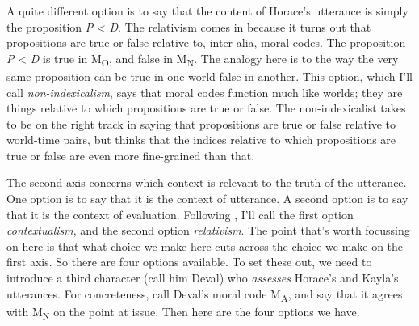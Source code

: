 A quite different option is to say that the content of Horace's utterance is simply the proposition \textit{P }{\textless}\textit{ D}. The relativism comes in because it turns out that propositions are true or false relative to, inter alia, moral codes. The proposition \textit{P }{\textless}\textit{ D} is true in M\textsubscript{O}, and false in M\textsubscript{N}. The analogy here is to the way the very same proposition can be true in one world false in another. This option, which I'll call \textit{non-indexicalism}, says that moral codes function much like worlds; they are things relative to which propositions are true or false. The non-indexicalist takes \citet{Kaplan1989} to be on the right track in saying that propositions are true or false relative to world-time pairs, but thinks that the indices relative to which propositions are true or false are even more fine-grained than that.

The second axis concerns which context is relevant to the truth of the utterance. One option is to say that it is the context of utterance. A second option is to say that it is the context of evaluation. Following \citet{MacFarlane2007-SMNIC, MacFarlane2009-MACNC}, I'll call the first option \textit{contextualism}, and the second option \textit{relativism}. The point that's worth focussing on here is that what choice we make here cuts across the choice we make on the first axis. So there are four options available. To set these out, we need to introduce a third character (call him Deval) who \textit{assesses} Horace's and Kayla's utterances. For concreteness, call Deval's moral code M\textsubscript{A}, and say that it agrees with M\textsubscript{N} on the point at issue. Then here are the four options we have.


